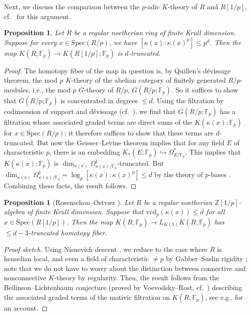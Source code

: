 \documentclass{amsart}
\newtheorem{proposition}[theorem]{Proposition}
\theoremstyle{definition}
\newcommand{\spec}{\mathrm{Spec}}
\begin{document}
Next, we discuss the comparison between the $p$-adic $K$-theory of $R$ and
$R[1/p]$, cf.~\cite[Lem.~3.5]{Niz08} for this argument. 
\begin{proposition} 
\label{invertingpconn}
Let $R$ be a regular noetherian ring of finite Krull dimension. 
Suppose for every $x \in \spec(R/p)$, we have $[\kappa(x): \kappa(x)^p] \leq
p^d$. 
Then the map $K(R; \mathbb{F}_p) \to K(R[1/p]; \mathbb{F}_p)$ is 
$d$-truncated. 
\end{proposition} 
\begin{proof} 
The homotopy fiber of the map in question is, by Quillen's d\'evissage theorem,
the mod $p$ $K$-theory of the abelian category of finitely generated
$R/p$-modules, 
i.e., the mod $p$ $G$-theory of $R/p$, $G(R/p; \mathbb{F}_p)$. 
So it suffices to show 
that $G(R/p; \mathbb{F}_p)$ is concentrated 
in degrees $\leq d$. 
Using the 
filtration by codimension of support and d\'evissage
(cf.~\cite[Th.~5.4]{Qui72}), 
we find that 
$G(R/p; \mathbb{F}_p)$ has a filtration whose associated graded terms are direct
sums of the $K( \kappa(x); \mathbb{F}_p)$ for $x \in \spec(R/p)$; it therefore
suffices to show that these terms are $d$-truncated. 
But now the Geisser--Levine theorem \cite{GL00} 
implies that for any field $E$ of characteristic $p$, there is an embedding
$K_*(E; \mathbb{F}_p) \hookrightarrow \Omega^{\ast}_{E/\mathbb{F}_p}$. 
This implies that $K(\kappa(x); \mathbb{F}_p)$ is 
$\dim_{\kappa(x)} \Omega^1_{\kappa(x)/\mathbb{F}_p}$-truncated. 
But 
$
\dim_{\kappa(x)} \Omega^1_{\kappa(x)/\mathbb{F}_p} = 
\log_p [\kappa(x): \kappa(x)^p]  \leq d
$ by the theory of $p$-bases
\cite[Th.~26.5]{Mat89}. Combining these facts, the result follows. 
\end{proof} 


\begin{proposition}[Rosenschon--{\O}stv{\ae}r \cite{RO06}]
\label{asymptoticKlocalityRO}
Let $R$ be a regular noetherian $\mathbb{Z}[1/p]$-algebra of finite Krull dimension. 
Suppose that $\mathrm{vcd}_p(\kappa(x)) \leq d$ for all $x \in \spec(R[1/p])$. 
Then the map 
$K(R; \mathbb{F}_p) \to L_{K(1)} K(R; \mathbb{F}_p)$ 
has $\leq d-3$-truncated homotopy fiber. 
\end{proposition} 
\begin{proof}[Proof sketch] 
Using Nisnevich descent \cite{TT90}, we reduce to the case where $R$ is
henselian local, and even
a field of characteristic $\neq p$ by Gabber--Suslin rigidity \cite{Gabber92}; note that we
do not have to worry about the distinction between connective and nonconnective
$K$-theory by regularity. Then, the result follows from 
the Beilinson--Lichtenbaum conjecture (proved by Voevodsky--Rost,
cf.~\cite{HW19}) describing the
associated graded terms of the motivic filtration on $K(R; \mathbb{F}_p)$, see
e.g., \cite[Sec.~6.2]{CM19} for an account. 
\end{proof} 
\end{document}
